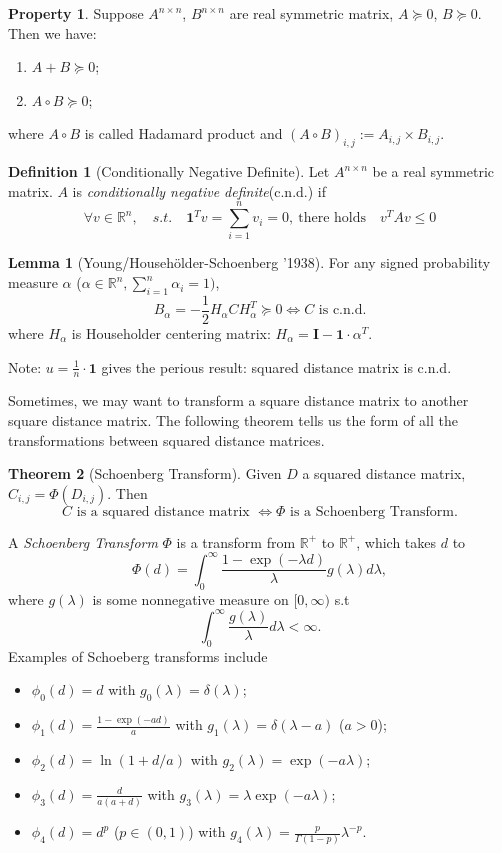 \documentclass[twoside]{article}
\theoremstyle{definition}
\newtheorem{thm}{Theorem}[section]
\newtheorem{lem}[thm]{Lemma}
\newtheorem*{property}{Property}
\theoremstyle{definition}
\newtheorem*{defn}{Definition}
\theoremstyle{remark}
\def\R{{\mathbb R}}
\begin{document}
\begin{property}
Suppose $A^{n\times n}$, $B^{n\times n}$ are real symmetric matrix, $A\succeq 0$, $B\succeq 0$. Then we have:
\begin{enumerate}
\item $A+B\succeq 0$;
\item $A\circ B\succeq 0$;
\end{enumerate}
where $A\circ B$ is called Hadamard product and $(A\circ B)_{i,j}:=A_{i,j}\times B_{i,j}$.
\end{property}


\begin{defn}[Conditionally Negative Definite]
Let $A^{n\times n}$ be a real symmetric matrix. $A$ is \emph{conditionally negative definite}(c.n.d.) if \\
$$\forall v \in \R^n, \quad s.t.\quad \mathbf{1}^T v=\sum^n_{i=1}v_i=0,\ \text{there holds}\quad  v^TAv \leq 0$$
\end{defn}

\begin{lem}[Young/Househ\"{o}lder-Schoenberg '1938]\label{lem:1} 
For any signed probability measure $\alpha$ ($\alpha \in \R^n,\sum^n_{i=1}\alpha_i=1)$,
$$B_\alpha = -\frac{1}{2}H_\alpha C H_\alpha^T \succeq 0 \iff \mbox{$C$ is c.n.d.} $$
where $H_\alpha$ is Householder centering matrix: $H_\alpha = \mathbf{I} - \mathbf{1}\cdot \alpha^T$.
\end{lem}

Note: $u = \frac{1}{n} \cdot \mathbf{1}$ gives the perious result: squared distance matrix is c.n.d.


Sometimes, we may want to transform a square distance matrix to another square distance matrix. The following theorem tells us the form of all the transformations between squared distance matrices.

\begin{thm}[Schoenberg Transform]
Given $D$ a squared distance matrix, $C_{i,j}=\Phi(D_{i,j})$. Then
$$\mbox{$C$ is a squared distance matrix $\iff \Phi$ is a Schoenberg Transform.}$$
\end{thm}

A \emph{Schoenberg Transform} $\Phi$ is a transform from $\R^+$ to $\R^+$, which takes $d$ to 
$$\Phi (d)=\int_0^\infty \frac{1-\exp{(-\lambda d)}}{\lambda}g(\lambda)d\lambda, $$ 
where $g(\lambda)$ is some nonnegative measure on $[0,\infty)$ s.t 
$$\displaystyle \int_0^\infty \frac{g(\lambda)}{\lambda}d\lambda<\infty.$$
Examples of Schoeberg transforms include 
\begin{itemize}
\item $\phi_0(d)=d$ with $g_0(\lambda)=\delta(\lambda)$;
\item $\displaystyle \phi_1(d) = \frac{1-\exp(-ad)}{a}$ with $g_1(\lambda) = \delta(\lambda-a)$ ($a>0$); 
\item $\phi_2(d) = \ln (1 + d/a)$ with $g_2(\lambda) = \exp(-a \lambda)$; 
\item $\displaystyle \phi_3(d)=\frac{d}{a(a+d)}$ with $g_3(\lambda)=\lambda \exp(-a \lambda)$;
\item $\displaystyle \phi_4(d)=d^p$ ($p\in (0,1)$) with $\displaystyle g_4(\lambda) = \frac{p}{\Gamma(1-p)} \lambda^{-p}$. 
\end{itemize}
\end{document}
